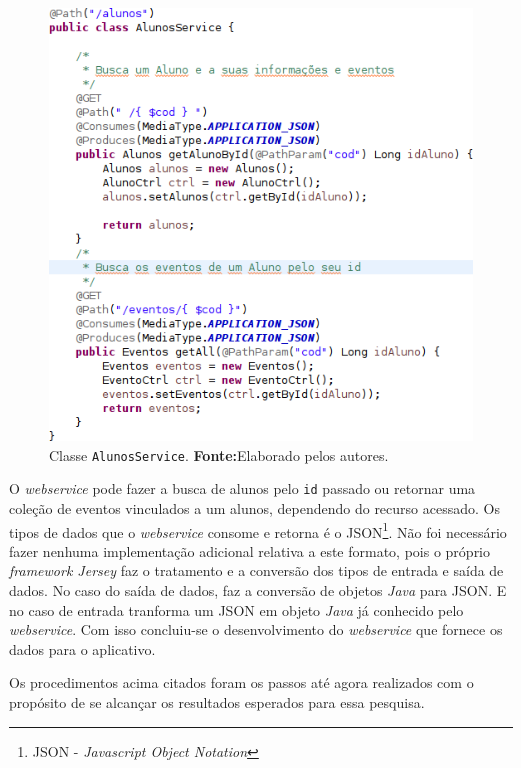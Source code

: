 		\begin{figure}[h!]
			\centerline{\includegraphics[scale=0.7]{./imagens/2_q_metodologico/qm13.png}}
			\caption[Classe \texttt{AlunosService}]{Classe \texttt{AlunosService}.
			\textbf{Fonte:}Elaborado pelos autores.}
			\label{fig:qm13}
		\end{figure}
		
		\par O \textit{webservice} pode fazer a busca de alunos pelo \texttt{id}
passado ou retornar uma coleção de eventos vinculados a um alunos, dependendo
do recurso acessado. Os tipos de dados que o \textit{webservice} consome e
retorna é o JSON\footnote{JSON - \textit{Javascript Object Notation}}. Não foi
necessário fazer nenhuma implementação adicional relativa a este formato, pois
o próprio \textit{framework Jersey} faz o tratamento e a conversão dos tipos de
entrada e saída de dados. No caso do saída de dados, faz a conversão de objetos 
\textit{Java} para JSON. E no caso de entrada tranforma um JSON em objeto
\textit{Java} já conhecido pelo \textit{webservice}. Com isso concluiu-se o
desenvolvimento do \textit{webservice} que fornece os dados para o aplicativo.

	\par Os procedimentos acima citados foram os passos até agora realizados com o
propósito de se alcançar os resultados esperados para essa pesquisa.
		